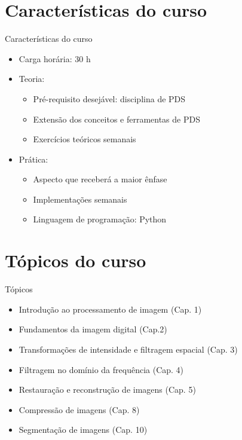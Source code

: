    \section[ slide = true]{Características do curso}
      \begin{slide}[toc=]{Características do curso}
         \begin{itemize}[type=1]
            \item Carga horária: 30 h%
            \item Teoria:
            \begin{itemize}
               \item Pré-requisito desejável: disciplina de PDS
               \item Extensão dos conceitos e ferramentas de PDS
               \item Exercícios teóricos semanais %
            \end{itemize}
            \item Prática:
            \begin{itemize}
               \item Aspecto que receberá a maior ênfase
               \item Implementações semanais 
               \item Linguagem de programação: Python 
            \end{itemize}
         \end{itemize}         
      \end{slide}

   \section[ slide = true]{Tópicos do curso}
   \begin{slide}[toc=]{Tópicos}
      \begin{itemize}[type=1]
         \item Introdução ao processamento de imagem (Cap. 1)
         \item Fundamentos da imagem digital (Cap.2)
         \item Transformações de intensidade e filtragem espacial (Cap. 3)
         \item Filtragem no domínio da frequência (Cap. 4) 
         \item Restauração e reconstrução de imagens (Cap. 5)
         \item Compressão de imagens (Cap. 8)
         \item Segmentação de imagens (Cap. 10)
      \end{itemize}
   \end{slide}

